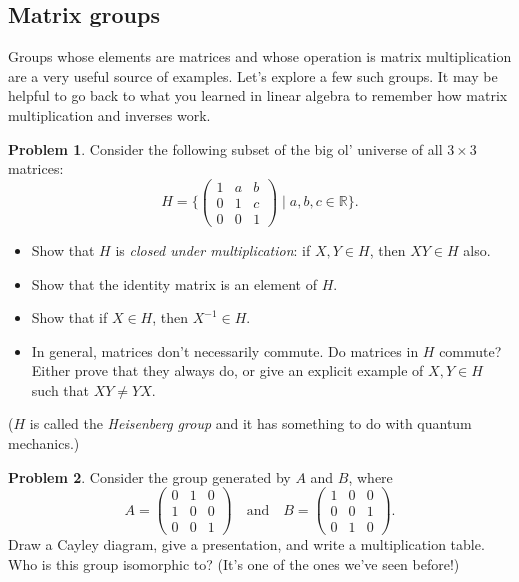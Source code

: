 \documentclass[12pt]{article}
\theoremstyle{definition} %
\newtheorem{problem}{Problem}
\newcommand{\R}{\mathbb{R}}
\newcommand\inv{^{-1}} %
\begin{document}
\subsection*{Matrix groups}
Groups whose elements are matrices and whose operation is matrix multiplication are a very useful source of examples. Let's explore a few such groups. It may be helpful to go back to what you learned in linear algebra to remember how matrix multiplication and inverses work.
\begin{problem}
    Consider the following subset of the big ol' universe of all $3\times 3$ matrices:
    \[ H = \{
    \begin{pmatrix} %
        1 & a & b \\
        0 & 1 & c \\
        0 & 0 & 1
    \end{pmatrix} \mid a, b, c\in \R\}.\]
    \begin{itemize}
        \item Show that $H$ is \textit{closed under multiplication}: if $X, Y \in H$, then $XY \in H$ also.
        \item Show that the identity matrix is an element of $H$.
        \item Show that if $X\in H$, then $X\inv \in H$.
        \item In general, matrices don't necessarily commute. Do matrices in $H$ commute? Either prove that they always do, or give an explicit example of $X, Y \in H$ such that $XY \neq YX$.
    \end{itemize}
    ($H$ is called the \textit{Heisenberg group} and it has something to do with quantum mechanics.)
\end{problem}

\begin{problem}
    Consider the group generated by $A$ and $B$, where
    \[A = 
    \begin{pmatrix}
        0 & 1 & 0 \\
        1 & 0 & 0 \\
        0 & 0 & 1
    \end{pmatrix} \quad \text{and} \quad
    B = 
    \begin{pmatrix} %
        1 & 0 & 0 \\ 0 & 0 & 1 \\ 0 & 1 & 0 
    \end{pmatrix}.
    \]
    Draw a Cayley diagram, give a presentation, and write a multiplication table. Who is this group isomorphic to? (It's one of the ones we've seen before!)
\end{problem}
\end{document}
